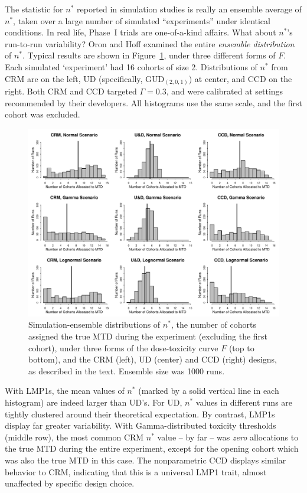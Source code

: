 The statistic for $n^*$ reported in simulation studies is really an ensemble average of $n^*$, taken over a large number of simulated ``experiments'' under identical conditions. In real life, Phase~I trials are one-of-a-kind affairs. What about $n^*$'s run-to-run variability? Oron and Hoff \citep{Oron:Hoff:smal:2013} examined the entire \emph{ensemble distribution} of $n^*$. Typical results are shown in Figure~\ref{fig:nstar}, under three different forms of $F$. Each simulated `experiment' had 16 cohorts of size 2. Distributions of $n^*$ from CRM are on the left, UD (specifically, GUD$_{(2,0,1)}$) at center, and CCD on the right. Both CRM and CCD targeted $\Gamma=0.3$, and were calibrated at settings recommended by their developers. All histograms use the same scale, and the first cohort was excluded.

\begin{figure}[!ht]
\begin{center}
\includegraphics[scale=0.73]{nstar}
\end{center}
\caption{Simulation-ensemble distributions of $n^*$, the number of cohorts assigned the true MTD during the experiment  (excluding the first cohort), under three forms of the dose-toxicity curve $F$ (top to bottom), and the CRM (left),  UD (center) and CCD (right) designs, as described in the text. Ensemble size was 1000 runs.}\label{fig:nstar}
\end{figure}

With LMP1s, the mean values of $n^*$ (marked by a solid vertical line in each histogram) are indeed larger than UD's. For UD, $n^*$ values in different runs are tightly clustered around their theoretical expectation. By contrast, LMP1s display far greater variability. With Gamma-distributed toxicity thresholds (middle row), the most common CRM $n^*$ value -- by far -- was \emph{zero} allocations to the true MTD during the entire experiment, except for the opening cohort which was also the true MTD in this case. The nonparametric CCD displays similar behavior to CRM, indicating that this is a universal LMP1 trait, almost unaffected by specific design choice.

